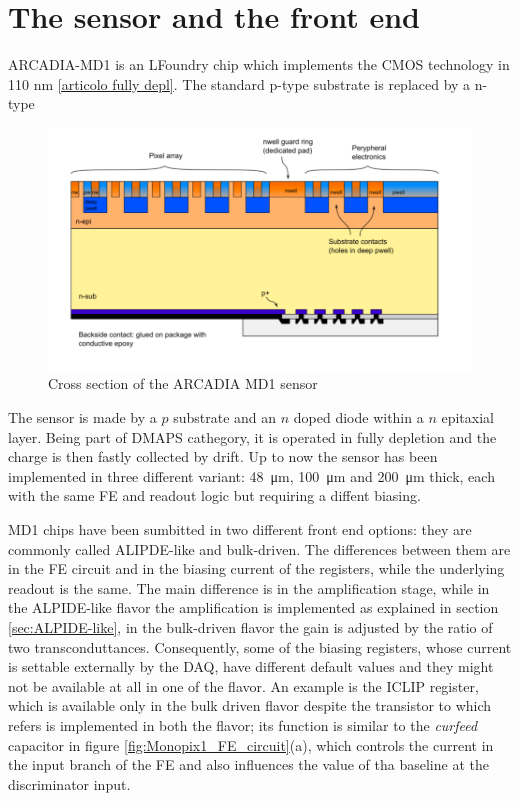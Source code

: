 \section{The sensor and the front end}
    ARCADIA-MD1 is an LFoundry chip which implements the CMOS technology in 110 nm \ref{articolo fully depl}.
    The standard p-type substrate is replaced by a n-type 
    \begin{figure}[h!]
        \centering
        \includegraphics[width=.8\linewidth]{figures/ARCADIA/sensor.png}
        \caption{Cross section of the ARCADIA MD1 sensor}
        \label{fig:ARCADIA_substrate}
    \end{figure}

    The sensor is made by a $p$ substrate and an $n$ doped diode within a $n$ epitaxial layer. 
    Being part of DMAPS cathegory, it is operated in fully depletion and the charge is then fastly collected by drift. 
    Up to now the sensor has been implemented in three different variant: \SI{48}{\um}, \SI{100}{\um} and \SI{200}{\um} thick, each with the same FE and readout logic but requiring a diffent biasing.  

        MD1 chips have been sumbitted in two different front end options: they are commonly called ALIPDE-like and bulk-driven.  
        The differences between them are in the FE circuit and in the biasing current of the registers, while the underlying readout is the same.
        The main difference is in the amplification stage, while in the ALPIDE-like flavor the amplification is implemented as explained in section \ref{sec:ALPIDE-like}, in the bulk-driven flavor the gain is adjusted by the ratio of two transconduttances. Consequently, some of the biasing registers, whose current is settable externally by the DAQ, have different default values and they might not be available at all in one of the flavor.
        An example is the ICLIP register, which is available only in the bulk driven flavor despite the transistor to which refers is implemented in both the flavor; its function is similar to the \emph{curfeed} capacitor in figure \ref{fig:Monopix1_FE_circuit}(a), which controls the current in the input branch of the FE and also influences the value of tha baseline at the discriminator input. 
        
